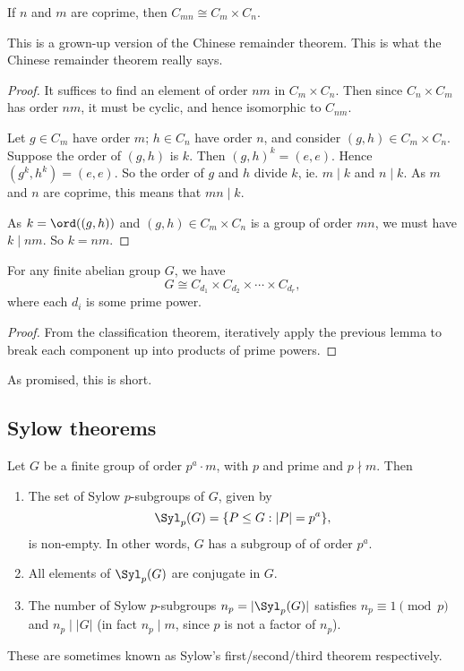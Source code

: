 \documentclass[a4paper]{article}
\begin{document}
\begin{lemma}
  If $n$ and $m$ are coprime, then $C_{mn} \cong C_m \times C_n$.
\end{lemma}
This is a grown-up version of the Chinese remainder theorem. This is what the Chinese remainder theorem really says.

\begin{proof}
  It suffices to find an element of order $nm$ in $C_m \times C_n$. Then since $C_n \times C_m$ has order $nm$, it must be cyclic, and hence isomorphic to $C_{nm}$.

  Let $g \in C_m$ have order $m$; $h \in C_n$ have order $n$, and consider $(g, h) \in C_m \times C_n$. Suppose the order of $(g, h)$ is $k$. Then $(g, h)^k = (e, e)$. Hence $(g^k, h^k) = (e, e)$. So the order of $g$ and $h$ divide $k$, ie. $m \mid k$ and $n \mid k$. As $m$ and $n$ are coprime, this means that $mn \mid k$.

  As $k = \ord((g, h))$ and $(g, h) \in C_m \times C_n$ is a group of order $mn$, we must have $k \mid nm$. So $k = nm$.
\end{proof}

\begin{cor}
  For any finite abelian group $G$, we have
  \[
    G \cong C_{d_1} \times C_{d_2} \times \cdots \times C_{d_r},
  \]
  where each $d_i$ is some prime power.
\end{cor}

\begin{proof}
  From the classification theorem, iteratively apply the previous lemma to break each component up into products of prime powers.
\end{proof}

As promised, this is short.

\subsection{Sylow theorems}
\begin{thm}
  Let $G$ be a finite group of order $p^a \cdot m$, with $p$ and prime and $p \nmid m$. Then
  \begin{enumerate}
    \item The set of Sylow $p$-subgroups of $G$, given by
      \[
        \Syl_p(G) = \{P \leq G: |P| = p^a\},
      \]
      is non-empty. In other words, $G$ has a subgroup of of order $p^a$.
    \item All elements of $\Syl_p(G)$ are conjugate in $G$.
    \item The number of Sylow $p$-subgroups $n_p = |\Syl_p(G)|$ satisfies $n_p \equiv 1 \pmod p$ and $n_p \mid |G|$ (in fact $n_p \mid m$, since $p$ is not a factor of $n_p$).
  \end{enumerate}
\end{thm}
These are sometimes known as Sylow's first/second/third theorem respectively.
\end{document}
